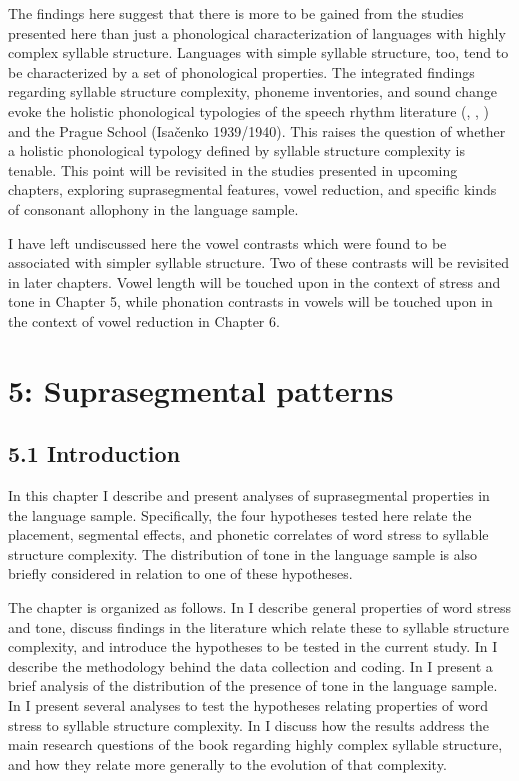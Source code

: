   The findings here suggest that there is more to be gained from the studies presented here than just a phonological characterization of languages with highly complex syllable structure. Languages with simple syllable structure, too, tend to be characterized by a set of phonological properties. The integrated findings regarding syllable structure complexity, phoneme inventories, and sound change evoke the holistic phonological typologies of the speech rhythm literature (\citealt{Roach1982}, \citealt{Dauer1983}, \citealt{Auer1993}) and the Prague School (Isačenko 1939/1940). This raises the question of whether a holistic phonological typology defined by syllable structure complexity is tenable. This point will be revisited in the studies presented in upcoming chapters, exploring suprasegmental features, vowel reduction, and specific kinds of consonant allophony in the language sample.



  I have left undiscussed here the vowel contrasts which were found to be associated with simpler syllable structure. Two of these contrasts will be revisited in later chapters. Vowel length will be touched upon in the context of stress and tone in Chapter 5, while phonation contrasts in vowels will be touched upon in the context of vowel reduction in Chapter 6.


\chapter{5: Suprasegmental patterns}
\section{\textbf{5.1} \textbf{Introduction}}

  In this chapter I describe and present analyses of suprasegmental properties in the language sample. Specifically, the four hypotheses tested here relate the placement, segmental effects, and phonetic correlates of word stress to syllable structure complexity. The distribution of tone in the language sample is also briefly considered in relation to one of these hypotheses.



  The chapter is organized as follows. In  I describe general properties of word stress and tone, discuss findings in the literature which relate these to syllable structure complexity, and introduce the hypotheses to be tested in the current study. In  I describe the methodology behind the data collection and coding. In  I present a brief analysis of the distribution of the presence of tone in the language sample. In  I present several analyses to test the hypotheses relating properties of word stress to syllable structure complexity. In  I discuss how the results address the main research questions of the book regarding highly complex syllable structure, and how they relate more generally to the evolution of that complexity.



